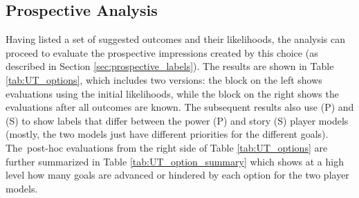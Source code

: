 \documentclass[arts,article,accept,moreauthors,pdftex,10pt,a4paper]{Definitions/mdpi}
\begin{document}
\subsection{Prospective Analysis}

Having listed a set of suggested outcomes and their likelihoods, the analysis can proceed to evaluate the prospective impressions created by this choice (as described in Section \ref{sec:prospective_labels}).
%
The results are shown in Table \ref{tab:UT_options}, which includes two versions: the block on the left shows evaluations using the initial likelihoods, while the block on the right shows the evaluations after all outcomes are known.
%
The subsequent results also use (P) and (S) to show labels that differ between the power (P) and story (S) player models (mostly, the two models just have different priorities for the different goals).
%
The~post-hoc evaluations from the right side of Table \ref{tab:UT_options} are further summarized in Table \ref{tab:UT_option_summary} which shows at a high level how many goals are advanced or hindered by each option for the two player models.
\end{document}

